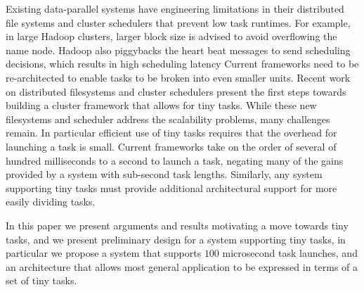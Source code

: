 Existing data-parallel systems have engineering limitations in their distributed
file systems and cluster schedulers that prevent low task runtimes. For example, in
large Hadoop clusters, larger block size is advised to avoid overflowing the name node.
Hadoop also piggybacks the heart beat messages to send scheduling decisions, which
results in high scheduling latency
Current frameworks need to be re-architected to enable tasks to be broken into even smaller
units. 
Recent work on distributed filesystems\cite{nightingale2012flat} and
cluster schedulers\cite{sparrow} present the first steps towards
building a cluster framework that allows for tiny tasks. While these new filesystems
and scheduler address the scalability problems, many challenges remain. In particular
efficient use of tiny tasks requires that the overhead for launching a task is small. Current
frameworks take on the order of several of hundred milliseconds to a second to launch a task, negating
many of the gains provided by a system with sub-second task lengths. Similarly, any system
supporting tiny tasks must provide additional architectural support for more easily dividing tasks.

In this paper we present arguments and results motivating a move towards tiny tasks,
and we present preliminary design for a system supporting tiny tasks, in particular
we propose a system that supports $100$ microsecond task launches, and an architecture
that allows most general application to be expressed in terms of a set of tiny tasks.

